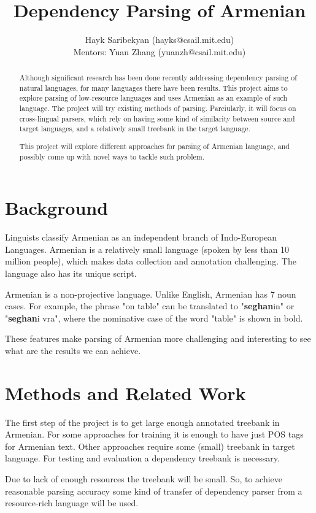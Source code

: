 \documentclass[]{article}
\title{Dependency Parsing of Armenian}
\author{Hayk Saribekyan (hayks@csail.mit.edu) \\ 
        Mentors: Yuan Zhang (yuanzh@csail.mit.edu)}
\begin{document}
\maketitle

\begin{abstract}
Although significant research has been done recently addressing dependency parsing of natural languages, for many languages there have been results.
This project aims to explore parsing of low-resource languages and uses Armenian as an example of such language.
The project will try existing methods of parsing.
Parciularly, it will focus on cross-lingual parsers, which rely on having some kind of similarity between source and target languages, and a relatively small treebank in the target language.

This project will explore different approaches for parsing of Armenian language, and possibly come up with novel ways to tackle such problem.
\end{abstract}

\section{Background}
Linguists classify Armenian as an independent branch of Indo-European Languages.
Armenian is a relatively small language (spoken by less than 10 million people), which makes data collection and annotation challenging.
The language also has its unique script.

Armenian is a non-projective language.
Unlike English, Armenian has 7 noun cases.
For example, the phrase "on table" can be translated to "\artm \textbf{seghan}in\aroff" or "\artm \textbf{seghan}i vra\aroff", where the nominative case of the word "table" is shown in bold.

These features make parsing of Armenian more challenging and interesting to see what are the results we can achieve.

\section{Methods and Related Work}
The first step of the project is to get large enough annotated treebank in Armenian.
For some approaches for training it is enough to have just POS tags for Armenian text.
Other approaches require some (small) treebank in target language.
For testing and evaluation a dependency treebank is necessary.

Due to lack of enough resources the treebank will be small.
So, to achieve reasonable parsing accuracy some kind of transfer of dependency parser from a resource-rich language will be used.
\end{document}
